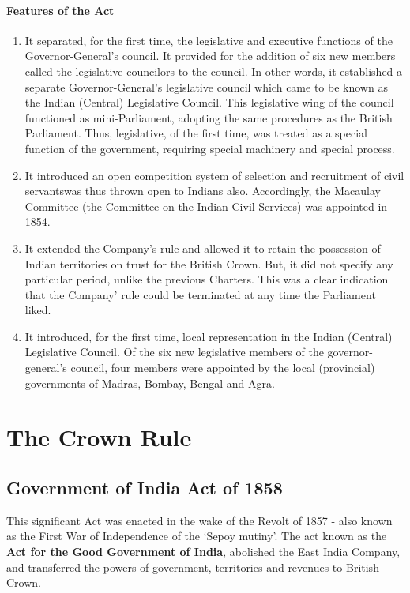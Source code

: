 \begin{multicols}{2}
\paragraph{Features of the Act}

\begin{enumerate}
  \item It separated, for the first time, the legislative and executive functions of the Governor-General's council. It provided for the addition of six new members called the legislative councilors to the council. In other words, it established a separate Governor-General's legislative council which came to be known as the Indian (Central) Legislative Council. This legislative wing of the council functioned as mini-Parliament, adopting the same procedures as the British Parliament. Thus, legislative, of the first time, was treated as a special function of the government, requiring special machinery and special process.
  \item It introduced an open competition system of selection and recruitment of civil servants\endnote was thus thrown open to Indians also. Accordingly, the Macaulay Committee (the Committee on the Indian Civil Services) was appointed in 1854.
  \item It extended the Company's rule and allowed it to retain the possession of Indian territories on trust for the British Crown. But, it did not specify any particular period, unlike the previous Charters. This was a clear indication that the Company' rule could be terminated at any time the Parliament liked.
  \item It introduced, for the first time, local representation in the Indian (Central) Legislative Council. Of the six new legislative members of the governor-general's council, four members were appointed by the local (provincial) governments of Madras, Bombay, Bengal and Agra.
\end{enumerate}

\section{The Crown Rule}

\subsection{Government of India Act of 1858}
This significant Act was enacted in the wake of the Revolt of 1857 - also known as the First War of Independence of the `Sepoy mutiny'. The act known as the \textbf{Act for the Good Government of India}, abolished the East India Company, and transferred the powers of government, territories and revenues to British Crown.


\end{multicols}
